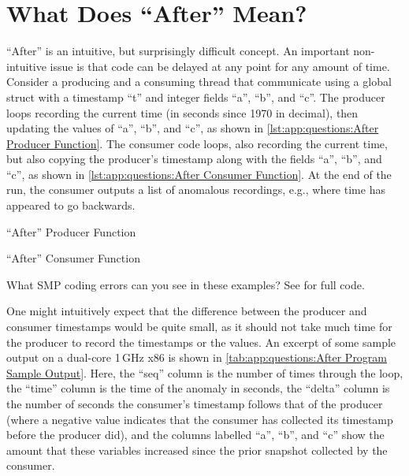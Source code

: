 
\section{What Does ``After'' Mean?}
\label{sec:app:questions:What Does ``After'' Mean?}

``After'' is an intuitive, but surprisingly difficult concept.
An important non-intuitive issue is that code can be delayed at
any point for any amount of time.
Consider a producing and a consuming thread that communicate using
a global struct with a timestamp ``t'' and integer fields ``a'', ``b'',
and ``c''.
The producer loops recording the current time
(in seconds since 1970 in decimal),
then updating the values of ``a'', ``b'', and ``c'',
as shown in \cref{lst:app:questions:After Producer Function}.
The consumer code loops, also recording the current time, but also
copying the producer's timestamp along with the fields ``a'',
``b'', and ``c'', as shown in
\cref{lst:app:questions:After Consumer Function}.
At the end of the run, the consumer outputs a list of anomalous recordings,
e.g., where time has appeared to go backwards.

\begin{listing}[htbp]

\caption{``After'' Producer Function}
\label{lst:app:questions:After Producer Function}
\end{listing}

\begin{listing}[htbp]

\caption{``After'' Consumer Function}
\label{lst:app:questions:After Consumer Function}
\end{listing}

\QuickQuiz{}
	What SMP coding errors can you see in these examples?
	See  for full code.
 \QuickQuizEnd

One might intuitively expect that the difference between the producer
and consumer timestamps would be quite small, as it should not take
much time for the producer to record the timestamps or the values.
An excerpt of some sample output on a dual-core 1\,GHz x86 is shown in
\cref{tab:app:questions:After Program Sample Output}.
Here, the ``seq'' column is the number of times through the loop,
the ``time'' column is the time of the anomaly in seconds, the ``delta''
column is the number of seconds the consumer's timestamp follows that
of the producer (where a negative value indicates that the consumer
has collected its timestamp before the producer did), and the
columns labelled ``a'', ``b'', and ``c'' show the amount that these
variables increased since the prior snapshot collected by the consumer.


